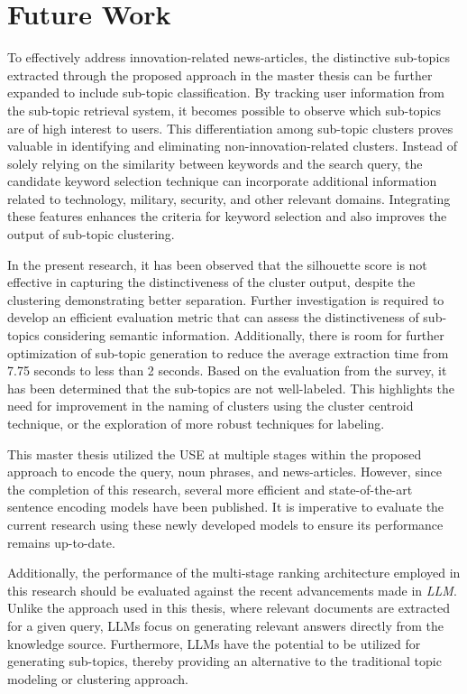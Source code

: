 \section{Future Work}

To effectively address innovation-related news-articles, the distinctive sub-topics extracted through the proposed approach in the master thesis can be further expanded to include sub-topic classification. By tracking user information from the sub-topic retrieval system, it becomes possible to observe which sub-topics are of high interest to users. This differentiation among sub-topic clusters proves valuable in identifying and eliminating non-innovation-related clusters. Instead of solely relying on the similarity between keywords and the search query, the candidate keyword selection technique can incorporate additional information related to technology, military, security, and other relevant domains. Integrating these features enhances the criteria for keyword selection and also improves the output of sub-topic clustering.

In the present research, it has been observed that the silhouette score is not effective in capturing the distinctiveness of the cluster output, despite the clustering demonstrating better separation. Further investigation is required to develop an efficient evaluation metric that can assess the distinctiveness of sub-topics considering semantic information. Additionally, there is room for further optimization of sub-topic generation to reduce the average extraction time from 7.75 seconds to less than 2 seconds. Based on the evaluation from the survey, it has been determined that the sub-topics are not well-labeled. This highlights the need for improvement in the naming of clusters using the cluster centroid technique, or the exploration of more robust techniques for labeling.

This master thesis utilized the \ac{USE} at multiple stages within the proposed approach to encode the query, noun phrases, and news-articles. However, since the completion of this research, several more efficient and state-of-the-art sentence encoding models have been published. It is imperative to evaluate the current research using these newly developed models to ensure its performance remains up-to-date.

Additionally, the performance of the multi-stage ranking architecture employed in this research should be evaluated against the recent advancements made in \emph{\ac{LLM}}. Unlike the approach used in this thesis, where relevant documents are extracted for a given query, \ac{LLM}s focus on generating relevant answers directly from the knowledge source. Furthermore, \ac{LLM}s have the potential to be utilized for generating sub-topics, thereby providing an alternative to the traditional topic modeling or clustering approach.


